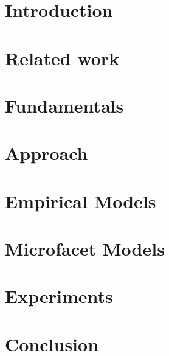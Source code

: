 \documentclass[11pt, a4paper,oneside]{book}
\begin{document}
	\chapter{Introduction}
	
	\chapter{Related work}
	
	\chapter{Fundamentals}
	
	\chapter{Approach}
	
	\chapter{Empirical Models}
	
	\chapter{Microfacet Models}
	
	\chapter{Experiments}
	
	\chapter{Conclusion}
	
 	\nocite{*}
	
	
	\printindex
\end{document}
